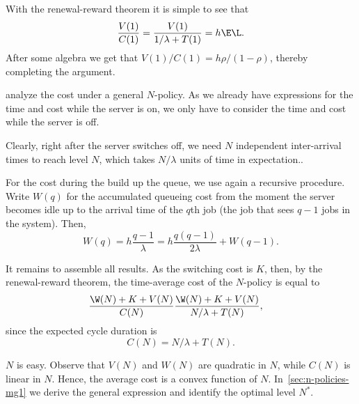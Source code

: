 With  the renewal-reward theorem it is simple to see that
\begin{equation*}
  \frac{V(1)}{C(1)} = \frac{V(1)}{1/\lambda + T(1)} = h \E\L.
\end{equation*}
After some algebra we get that $V(1)/C(1)=h\rho/(1-\rho)$, thereby completing the argument.

 analyze the cost under a general $N$-policy.
As we already have expressions for the time and cost while the server is on, we only have to consider the time and cost while the server is off.

Clearly, right after the server switches off, we need $N$ independent inter-arrival times to reach level $N$, which takes $N/\lambda$ units of time in expectation..

For the cost during the build up the queue, we use again a recursive procedure.
Write $W(q)$ for the accumulated queueing cost
from the moment the server becomes idle up to the arrival time of the $q$th job (the job that sees $q-1$ jobs in the system).
Then,
\begin{equation}\label{eq:99}
  W(q) = h\frac{q-1}{\lambda} = h \frac{q(q-1)}{2\lambda} + W(q-1).
\end{equation}

It remains to assemble all results.
As the switching cost is $K$, then, by the renewal-reward theorem, the time-average cost of the $N$-policy is equal to
\begin{align*}
  \frac{\W(N)+K+V(N)}{C(N)} &
  \frac{\W(N)+K+V(N)}{N/\lambda + T(N)},
\end{align*}
since the expected cycle duration is
\begin{equation*}
C(N) = N/\lambda + T(N).
\end{equation*}

 $N$ is easy.
Observe that $V(N)$ and $W(N)$ are quadratic in $N$, while $C(N)$ is linear in $N$.
Hence, the average cost is a convex function of $N$.
In~\cref{sec:n-policies-mg1} we derive the general expression and identify the optimal level $N^*$.


